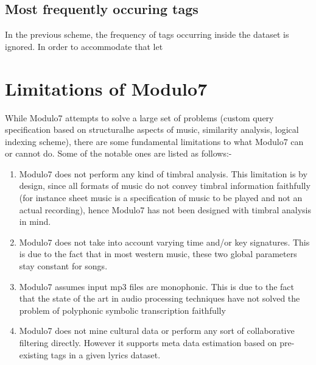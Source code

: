 \subsection{Most frequently occuring tags}

\noindent In the previous scheme, the frequency of tags occurring inside the dataset is ignored. In order to accommodate that let 

\section{Limitations of Modulo7} 

\noindent While Modulo7 attempts to solve a large set of problems (custom query specification based on structuralhe  aspects of music, similarity analysis, logical indexing scheme), there are some fundamental limitations to what Modulo7 can or cannot do. Some of the notable ones are listed as follows:-

\begin{enumerate}
\item Modulo7 does not perform any kind of timbral analysis. This limitation is by design, since all formats of music do not convey timbral information faithfully (for instance sheet music is a specification of music to be played and not an actual recording), hence Modulo7 has not been designed with timbral analysis in mind.
\item Modulo7 does not take into account varying time and/or key signatures. This is due to the fact that in most western music, these two global parameters stay constant for songs.
\item Modulo7 assumes input mp3 files are monophonic. This is due to the fact that the state of the art in audio processing techniques have not solved the problem of polyphonic symbolic transcription faithfully  \cite{melextract}
\item Modulo7 does not mine cultural data or perform any sort of collaborative filtering directly. However it supports meta data estimation based on pre-existing tags in a given lyrics dataset.
\end{enumerate}
